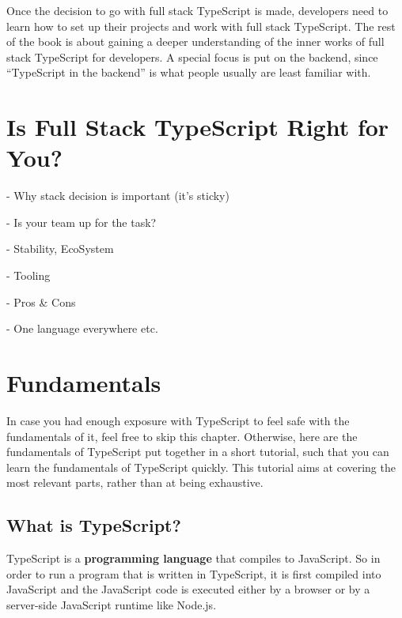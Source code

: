 \documentclass[12pt,a4paper]{report}
\begin{document}
Once the decision to go with full stack TypeScript is made, developers need to learn how to set up their projects and work with full stack TypeScript. The rest of the book is about gaining a deeper understanding of the inner works of full stack TypeScript for developers. A special focus is put on the backend, since ``TypeScript in the backend'' is what people usually are least familiar with.

\chapter{Is Full Stack TypeScript Right for You?}

- Why stack decision is important (it's sticky)

- Is your team up for the task?

- Stability, EcoSystem

- Tooling

- Pros \& Cons

- One language everywhere etc.

\chapter{Fundamentals}
\label{chapter:fundamentals}

In case you had enough exposure with TypeScript to feel safe with the fundamentals of it, feel free to skip this chapter. Otherwise, here are the fundamentals of TypeScript put together in a short tutorial, such that you can learn the fundamentals of TypeScript quickly. This tutorial aims at covering the most relevant parts, rather than at being exhaustive.

\section{What is TypeScript?}

TypeScript is a \textbf{programming language} that compiles to JavaScript. So in order to run a program that is written in TypeScript, it is first compiled into JavaScript and the JavaScript code is executed either by a browser or by a server-side JavaScript runtime like Node.js.
\end{document}
